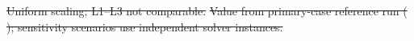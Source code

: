 \documentclass[a4paper,fleqn]{cas-sc} %
\providecommand{\DIFdel}[1]{{\protect\color{red}\sout{#1}}} %
\providecommand{\DIFdelFL}[1]{\DIFdel{#1}} %
\providecommand{\Lplus}{\ensuremath{\mathrm{L3^{+}}}}
\providecommand{\Cref}[1]{\ref{#1}}
\begin{document}
\DIFdelFL{Uniform scaling; L1--L3 not comparable.
  }%
\DIFdelFL{Value from primary-case reference run
    (}%
\DIFdelFL{); sensitivity scenarios use
    independent solver instances.
}%

\end{document}
